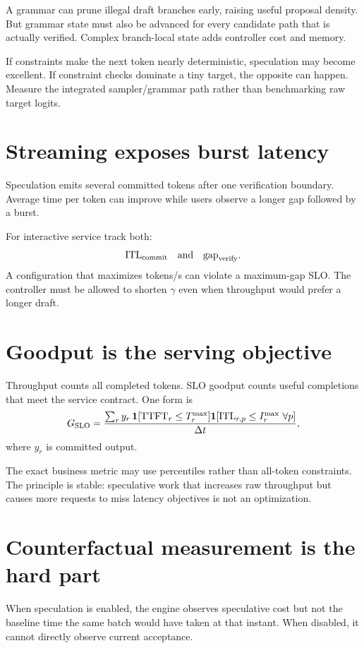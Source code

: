 A grammar can prune illegal draft branches early, raising useful proposal density.
But grammar state must also be advanced for every candidate path that is actually
verified. Complex branch-local state adds controller cost and memory.

If constraints make the next token nearly deterministic, speculation may become
excellent. If constraint checks dominate a tiny target, the opposite can happen.
Measure the integrated sampler/grammar path rather than benchmarking raw target logits.

\section{Streaming exposes burst latency}

Speculation emits several committed tokens after one verification boundary. Average
time per token can improve while users observe a longer gap followed by a burst.

For interactive service track both:
\[
\mathrm{ITL}_{\rm commit}
\quad\text{and}\quad
\mathrm{gap}_{\rm verify}.
\]
A configuration that maximizes tokens/s can violate a maximum-gap SLO. The controller
must be allowed to shorten $\gamma$ even when throughput would prefer a longer draft.

\section{Goodput is the serving objective}

Throughput counts all completed tokens. SLO goodput counts useful completions that meet
the service contract. One form is
\[
G_{\rm SLO}=
\frac{\sum_r y_r\,
\mathbf{1}[\mathrm{TTFT}_r\le T_r^{\max}]
\mathbf{1}[\mathrm{ITL}_{r,p}\le I_r^{\max}\ \forall p]}
{\Delta t},
\]
where $y_r$ is committed output.

The exact business metric may use percentiles rather than all-token constraints. The
principle is stable: speculative work that increases raw throughput but causes more
requests to miss latency objectives is not an optimization.

\section{Counterfactual measurement is the hard part}

When speculation is enabled, the engine observes speculative cost but not the baseline
time the same batch would have taken at that instant. When disabled, it cannot directly
observe current acceptance.

